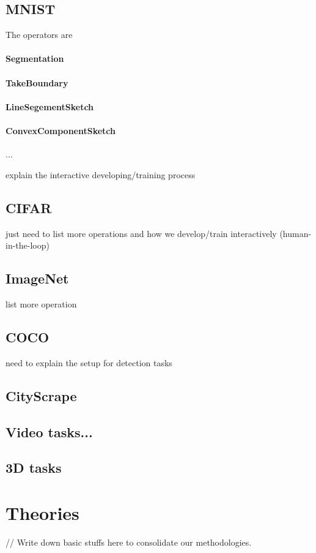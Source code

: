 \documentclass[10pt, oneside]{article}   	%
\theoremstyle{definition}
\begin{document}
\subsection{MNIST}
The operators are
\paragraph{Segmentation}
\paragraph{TakeBoundary}
\paragraph{LineSegementSketch}
\paragraph{ConvexComponentSketch}

...

explain the interactive developing/training process
\subsection{CIFAR}
just need to list more operations and how we develop/train interactively (human-in-the-loop)
\subsection{ImageNet}list more operation
\subsection{COCO}
need to explain the setup for detection tasks
\subsection{CityScrape}
\subsection{Video tasks...}
\subsection{3D tasks}
\section{Theories}
// Write down basic stuffs here to consolidate our methodologies.
\end{document}
